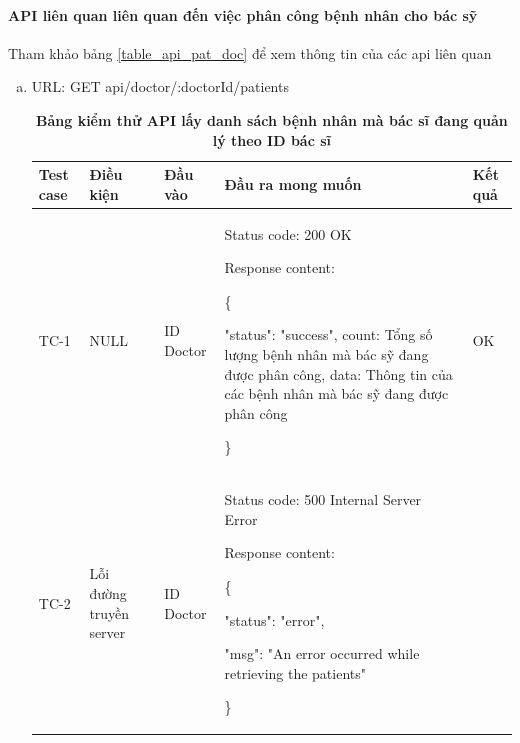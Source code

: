 \paragraph{API liên quan liên quan đến việc phân công bệnh nhân cho bác sỹ}
\mbox{}

Tham khảo bảng \ref{table_api_pat_doc} để xem thông tin của các api liên quan

\begin{enumerate}[a)]
  \item URL: GET api/doctor/{:doctorId}/patients
  
  \begin{xltabular}{\textwidth}{
    | >{\raggedright\arraybackslash}p{1cm}
    | >{\raggedright\arraybackslash}p{1cm}
    | >{\raggedright\arraybackslash}p{1.5cm}
    | >{\raggedright\arraybackslash}X
    | >{\raggedright\arraybackslash}p{1cm}|
    }
    \caption{\bfseries \fontsize{12pt}{0pt}\selectfont Bảng kiểm thử API lấy danh sách bệnh nhân mà bác sĩ đang quản lý theo ID bác sĩ}
    \\
    \hline
    \bfseries Test case    &\bfseries Điều kiện   &\bfseries Đầu vào 
    &\bfseries Đầu ra mong muốn &\bfseries Kết quả\\ \hline
  
  
    TC-1
    & NULL
    & ID Doctor

    & 
  
    Status code: 200 OK
  
      Response content:
  
      \{
  
    "status": "success",
    count: Tổng số lượng bệnh nhân mà bác sỹ đang được phân công,
    data: Thông tin của các bệnh nhân mà bác sỹ đang được phân công
  
    \}
    
    & OK
  
    \\ \hline
  
    TC-2
    & Lỗi đường truyền server
    & ID Doctor

   &
  
    Status code: 500 Internal Server Error
  
      Response content:
  
      \{
  
    "status": "error",
  
    "msg": "An error occurred while retrieving the patients"
  
    \}
    

\end{xltabular}
\end{enumerate}
